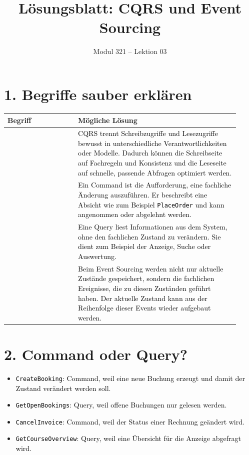 \documentclass[11pt,a4paper]{article}
\title{\textbf{Lösungsblatt: CQRS und Event Sourcing}}
\author{Modul 321 -- Lektion 03}
\date{}
\newcommand{\term}[1]{\fcolorbox{black!20}{blue!6}{\strut #1}}
\newcommand{\solution}[1]{\textcolor{black}{#1}}
\begin{document}
\maketitle


\section*{1. Begriffe sauber erklären}
\begin{longtable}{|>{\raggedright\arraybackslash}p{0.28\linewidth}|>{\raggedright\arraybackslash}p{0.64\linewidth}|}
\hline
\textbf{Begriff} & \textbf{Mögliche Lösung} \\
\hline
\term{CQRS} &
\solution{CQRS trennt Schreibzugriffe und Lesezugriffe bewusst in unterschiedliche Verantwortlichkeiten oder Modelle. Dadurch können die Schreibseite auf Fachregeln und Konsistenz und die Leseseite auf schnelle, passende Abfragen optimiert werden.} \\ \hline
\term{Command} &
\solution{Ein Command ist die Aufforderung, eine fachliche Änderung auszuführen. Er beschreibt eine Absicht wie zum Beispiel \texttt{PlaceOrder} und kann angenommen oder abgelehnt werden.} \\ \hline
\term{Query} &
\solution{Eine Query liest Informationen aus dem System, ohne den fachlichen Zustand zu verändern. Sie dient zum Beispiel der Anzeige, Suche oder Auswertung.} \\ \hline
\term{Event Sourcing} &
\solution{Beim Event Sourcing werden nicht nur aktuelle Zustände gespeichert, sondern die fachlichen Ereignisse, die zu diesen Zuständen geführt haben. Der aktuelle Zustand kann aus der Reihenfolge dieser Events wieder aufgebaut werden.} \\ \hline
\end{longtable}

\section*{2. Command oder Query?}
\begin{itemize}
  \item \solution{\texttt{CreateBooking}: Command, weil eine neue Buchung erzeugt und damit der Zustand verändert werden soll.}
  \item \solution{\texttt{GetOpenBookings}: Query, weil offene Buchungen nur gelesen werden.}
  \item \solution{\texttt{CancelInvoice}: Command, weil der Status einer Rechnung geändert wird.}
  \item \solution{\texttt{GetCourseOverview}: Query, weil eine Übersicht für die Anzeige abgefragt wird.}
\end{itemize}
\end{document}
